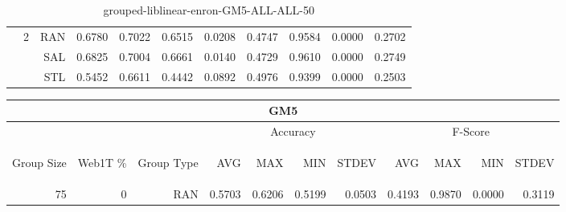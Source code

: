 \begin{center}
\begin{table}[htbp]
\begin{center}
\begin{tabular}{ | r | r | r | r | r | r | r | r | r | r | r |}
 & \multirow{3}{*}{2} & RAN & 0.6780 & 0.7022 & 0.6515 & 0.0208 & 0.4747 & 0.9584 & 0.0000 & 0.2702\\ \cline{3-11}
 &   & SAL & 0.6825 & 0.7004 & 0.6661 & 0.0140 & 0.4729 & 0.9610 & 0.0000 & 0.2749\\ \cline{3-11}
 &   & STL & 0.5452 & 0.6611 & 0.4442 & 0.0892 & 0.4976 & 0.9399 & 0.0000 & 0.2503\\ \cline{2-11}
\hline
\end{tabular}
\caption{grouped-liblinear-enron-GM5-ALL-ALL-50}
\end{center}
 \end{table}
\end{center}

\begin{center}
\begin{table}[htbp] 
 \begin{center}
\begin{tabular}{ | r | r | r | r | r | r | r | r | r | r | r |}
\hline
\multicolumn{11}{|c|}{GM5}\\
\hline
 & & & \multicolumn{4}{|c|}{Accuracy} & \multicolumn{4}{|c|}{F-Score}\\ \cline{4-11}
\begin{sideways}Group Size\end{sideways} & \begin{sideways}Web1T \%\end{sideways} & \begin{sideways}Group Type\end{sideways} & \begin{sideways}AVG\end{sideways} & \begin{sideways}MAX\end{sideways} & \begin{sideways}MIN\end{sideways} & \begin{sideways}STDEV\end{sideways} & \begin{sideways}AVG\end{sideways} & \begin{sideways}MAX\end{sideways} & \begin{sideways}MIN\end{sideways} & \begin{sideways}STDEV\end{sideways}\\
\hline
\multirow{9}{*}{75}
 & \multirow{3}{*}{0} & RAN & 0.5703 & 0.6206 & 0.5199 & 0.0503 & 0.4193 & 0.9870 & 0.0000 & 0.3119\\ \cline{3-11}

\end{tabular}
\end{center}
\end{table}
\end{center}
